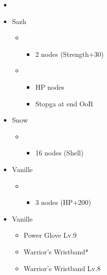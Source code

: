 \begin{menu}
	\begin{itemize}
	\paradigm
		\begin{itemize}
			\item {}%
				{\paradigmline{\com}{\sen}{\com}}%
				{\paradigmline[4]{\com}{(\sen)}{\sab}}%
				{\paradigmline{\rav}{\sen}{\rav}}%
				{\paradigmline{\syn}{\sen}{(\med)}}%
				{\paradigmline{(\sen)}{(\sen)}{(\com)}}%
				{\paradigmline{(\sen)}{(\rav)}{\sab}}%
		\end{itemize}
	\crystarium
		\begin{itemize}
			\item Sazh
				\begin{itemize}
					\item \com
						\begin{itemize}
							\item 2 nodes (Strength+30)
						\end{itemize}		
					\item \syn
						\begin{itemize}
							\item HP nodes
							\item Stopga at end OoR
						\end{itemize}
				\end{itemize}
			\item Snow
				\begin{itemize}
					\item \syn
						\begin{itemize}
							\item 16 nodes (Shell)
						\end{itemize}
				\end{itemize}
			\item Vanille
				\begin{itemize}
					\item \sab
						\begin{itemize}
							\item 3 nodes (HP+200)
						\end{itemize}		
				\end{itemize}								
		\end{itemize}
	\equip
		\begin{itemize}
			\item Vanille
				\begin{itemize}
					\item Power Glove Lv.9	
					\item Warrior's Wristband*
					\item Warrior's Wristband Lv.8
				\end{itemize}
		\end{itemize}
	\end{itemize}
\end{menu}

